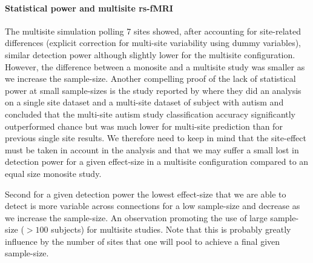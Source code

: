 \documentclass[authoryear]{elsarticle}
\begin{document}
\paragraph{Statistical power and multisite rs-fMRI} The multisite simulation polling 7 sites showed, after accounting for site-related differences (explicit correction for multi-site variability using dummy variables), similar detection power although slightly lower for the multisite configuration. However, the difference between a monosite and a multisite study was smaller as we increase the sample-size. Another compelling proof of the lack of statistical power at small sample-sizes is the study reported by \cite{Nielsen2013} where they did an analysis on a single site dataset and a multi-site dataset of subject with autism and concluded that the multi-site autism study classification accuracy significantly outperformed chance but was much lower for multi-site prediction than for previous single site results. We therefore need to keep in mind that the site-effect must be taken in account in the analysis and that we may suffer a small lost in detection power for a given effect-size in a multisite configuration compared to an equal size monosite study.\\
\par
Second for a given detection power the lowest effect-size that we are able to detect is more variable across connections for a low sample-size and decrease as we increase the sample-size.  
An observation promoting the use of large sample-size ($>100$ subjects) for multisite studies. Note that this is probably greatly influence by the number of sites that one will pool to achieve a final given sample-size. 


\end{document}
